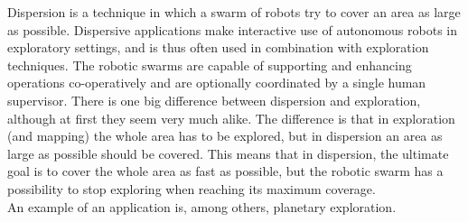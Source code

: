 
Dispersion is a technique in which a swarm of robots try to cover an area as large as possible.  
Dispersive applications make interactive use of autonomous robots in exploratory settings, and is thus often used in combination with exploration techniques. 
The robotic swarms are capable of supporting and enhancing operations co-operatively and are optionally coordinated by a single human supervisor. 
There is one big difference between dispersion and exploration, although at first they seem very much alike. 
The difference is that in exploration (and mapping) the whole area has to be explored, but in dispersion an area as large as possible should be covered. 
This means that in dispersion, the ultimate goal is to cover the whole area as fast as possible, but the robotic swarm has a possibility to stop exploring when reaching its maximum coverage. \\

An example of an application is, among others, planetary exploration. \cite{ludwig2006robotic,Penders2011}

    
